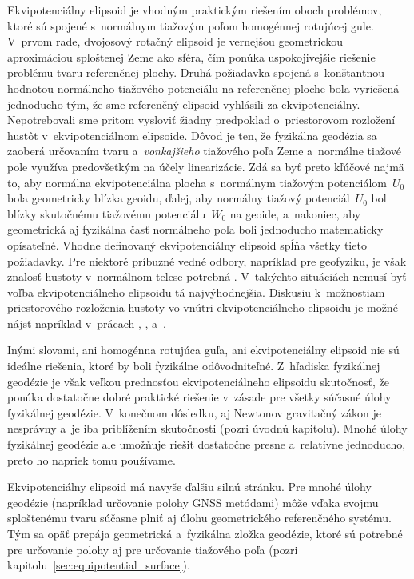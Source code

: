 \documentclass[a4paper, 12pt]{book}
\begin{document}
Ekvipotenciálny elipsoid je vhodným praktickým riešením oboch problémov, ktoré 
sú spojené s~normálnym tiažovým poľom homogénnej rotujúcej gule.  V~prvom rade, 
dvojosový rotačný elipsoid je vernejšou geometrickou aproximáciou sploštenej 
Zeme ako sféra, čím ponúka uspokojivejšie riešenie problému tvaru referenčnej 
plochy.  Druhá požiadavka spojená s~konštantnou hodnotou normálneho tiažového 
potenciálu na referenčnej ploche bola vyriešená jednoducho tým, že sme 
referenčný elipsoid vyhlásili za ekvipotenciálny.  Nepotrebovali sme pritom 
vysloviť žiadny predpoklad o~priestorovom rozložení hustôt v~ekvipotenciálnom 
elipsoide.  Dôvod je ten, že fyzikálna geodézia sa zaoberá určovaním tvaru 
a~\emph{vonkajšieho} tiažového poľa Zeme a~normálne tiažové pole využíva 
predovšetkým na účely linearizácie.  Zdá sa byť preto kľúčové najmä to, aby 
normálna ekvipotenciálna plocha s~normálnym tiažovým potenciálom~$U_0$ bola 
geometricky blízka geoidu, ďalej, aby normálny tiažový potenciál~$U_0$ bol 
blízky skutočnému tiažovému potenciálu~$W_0$ na geoide, a~nakoniec, aby 
geometrická aj fyzikálna časť normálneho poľa boli jednoducho matematicky 
opísateľné.  Vhodne definovaný ekvipotenciálny elipsoid spĺňa všetky tieto 
požiadavky.  Pre niektoré príbuzné vedné odbory, napríklad pre geofyziku, je 
však znalosť hustoty v~normálnom telese potrebná \parencite{Karcol2017}.  
V~takýchto situáciách nemusí byť voľba ekvipotenciálneho elipsoidu tá 
najvýhodnejšia.  Diskusiu k~možnostiam priestorového rozloženia hustoty vo 
vnútri ekvipotenciálneho elipsoidu je možné nájsť napríklad v~prácach 
\textcite{MoritzTheFigureOfTheEarth}, \textcite{Conway2000}, 
\textcite{TorgeGeodesy} a~\textcite{Karcol2017}.

Inými slovami, ani homogénna rotujúca guľa, ani ekvipotenciálny elipsoid nie sú 
ideálne riešenia, ktoré by boli fyzikálne odôvodniteľné.  Z~hľadiska fyzikálnej 
geodézie je však veľkou prednosťou ekvipotenciálneho elipsoidu skutočnosť, že 
ponúka dostatočne dobré praktické riešenie v~zásade pre všetky súčasné úlohy 
fyzikálnej geodézie.  V~konečnom dôsledku, aj Newtonov gravitačný zákon je 
nesprávny a~je iba priblížením skutočnosti (pozri úvodnú kapitolu).  Mnohé 
úlohy fyzikálnej geodézie ale umožňuje riešiť dostatočne presne a~relatívne 
jednoducho, preto ho napriek tomu používame.

Ekvipotenciálny elipsoid má navyše ďalšiu silnú stránku.  Pre mnohé úlohy 
geodézie (napríklad určovanie polohy GNSS metódami) môže vďaka svojmu 
sploštenému tvaru súčasne plniť aj úlohu geometrického referenčného systému.  
Tým sa opäť prepája geometrická a~fyzikálna zložka geodézie, ktoré sú potrebné 
pre určovanie polohy aj pre určovanie tiažového poľa (pozri 
kapitolu~\ref{sec:equipotential_surface}).
\end{document}
